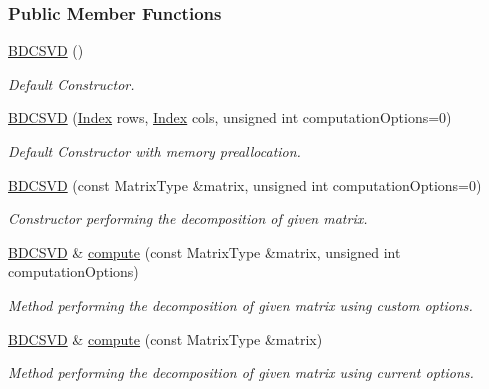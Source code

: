 \subsubsection*{Public Member Functions}
\begin{DoxyCompactItemize}
\item 
\hyperlink{group___s_v_d___module_a39514816d38f9c418cf3f3514b511c2c}{B\+D\+C\+S\+VD} ()
\begin{DoxyCompactList}\small\item\em Default Constructor. \end{DoxyCompactList}\item 
\hyperlink{group___s_v_d___module_a3e1fa48b3d042b7daf7392724a68bb60}{B\+D\+C\+S\+VD} (\hyperlink{group___s_v_d___module_a6229a37997eca1072b52cca5ee7a2bec}{Index} rows, \hyperlink{group___s_v_d___module_a6229a37997eca1072b52cca5ee7a2bec}{Index} cols, unsigned int computation\+Options=0)
\begin{DoxyCompactList}\small\item\em Default Constructor with memory preallocation. \end{DoxyCompactList}\item 
\hyperlink{group___s_v_d___module_a302746d9c534cd513c1df87c7ae4850d}{B\+D\+C\+S\+VD} (const Matrix\+Type \&matrix, unsigned int computation\+Options=0)
\begin{DoxyCompactList}\small\item\em Constructor performing the decomposition of given matrix. \end{DoxyCompactList}\item 
\hyperlink{group___s_v_d___module_class_eigen_1_1_b_d_c_s_v_d}{B\+D\+C\+S\+VD} \& \hyperlink{group___s_v_d___module_a52e3c627775010775c64d16a00cdb770}{compute} (const Matrix\+Type \&matrix, unsigned int computation\+Options)
\begin{DoxyCompactList}\small\item\em Method performing the decomposition of given matrix using custom options. \end{DoxyCompactList}\item 
\hyperlink{group___s_v_d___module_class_eigen_1_1_b_d_c_s_v_d}{B\+D\+C\+S\+VD} \& \hyperlink{group___s_v_d___module_acf27f41ed044d74ea8e8cbaf17ffdb04}{compute} (const Matrix\+Type \&matrix)
\begin{DoxyCompactList}\small\item\em Method performing the decomposition of given matrix using current options. \end{DoxyCompactList}\item 

\end{DoxyCompactItemize}

